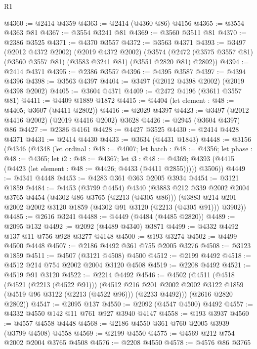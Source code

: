 \begin{lexlean}{R1}
\begin{coremodule}
@4360 := @2414 @4359
@4363 := @2414 (@4360 @86) @4156
@4365 := @3554 @4363 @81
@4367 := @3554 @3241 @81
@4369 := @3560 @3511 @81
@4370 := @2386 @3525
@4371 := @4370 @3557
@4372 := @3563 @4371
@4393 := @3497
    (@2012 @4372 @2002)
    (@2019 @4372 @2002)
    (@3574 (@2472 (@3575 @3557 @81) (@3560 @3557 @81) (@3583 @3241 @81) (@3551 @2820 @81) @2802))
@4394 := @2414 @4371
@4395 := @2386 @3557
@4396 := @4395 @3587
@4397 := @4394 @4396
@4398 := @3563 @4397
@4404 := @3497 (@2012 @4398 @2002) (@2019 @4398 @2002)
@4405 := @3604 @4371
@4409 := @2472 @4196 (@3611 @3557 @81)
@4411 := @4409 @1889 @1872
@4415 := @4404 (let element : @48 := @4405; @3607 (@4411 @2802))
@4416 := @2029 @4397
@4423 := @3497 (@2012 @4416 @2002) (@2019 @4416 @2002) @3628
@4426 := @2945 (@3604 @4397) @86
@4427 := @2386 @4161
@4428 := @4427 @3525
@4430 := @2414 @4428 @4371
@4431 := @2414 @4430
@4433 := @3634 (@4431 @1843)
@4448 := @3156
    (@4346
      (@4348
        (let ordinal : @48 := @4007;
        let batch : @48 := @4356;
        let phase : @48 := @4365;
        let i2 : @48 := @4367;
        let i3 : @48 := @4369;
        @4393 (@4415 (@4423 (let element : @48 := @4426; @4433 (@4411 @2855)))))
        @3506))
@4449 := @4341 @4448
@4453 := @4283 @361 @363 @2005 @3934
@4454 := @3121 @1859
@4484 := @4453
    (@3799 @4454)
    @4340
    (@3883
      @212
      @339
      @2002
      @2004
      @3765
      @4454
      (@4302 @86 @3765 (@2213 (@4305 @86)))
      (@3883 @214 @201 @2002 @2002 @3120 @1859 (@4302 @91 @3120 (@2213 (@4305 @91))) @3902))
@4485 := @2616 @3241
@4488 := @4449 (@4484 (@4485 @2820))
@4489 := @2095 @132
@4492 := @2092 (@4489 @4340) @3871
@4499 := @4332 @4492 @137 @11 @756 @928 @3277 @4148
@4500 := @193 @3274
@4502 := @4499 @4500 @4448
@4507 := @2186 @4492 @361 @755 @2005 @3276
@4508 := @3123 @1859
@4511 := @4507 (@3121 @4508) @4500
@4512 := @2199 @4492
@4518 := @4512 @214 @754 @2002 @2004 @3120 @4508
@4519 := @2208 @4492
@4521 := @4519 @91 @3120
@4522 := @2214 @4492
@4546 := @4502
    (@4511
      (@4518
        (@4521 (@2213 (@4522 @91)))
        (@4512
          @216
          @201
          @2002
          @2002
          @3122
          @1859
          (@4519 @96 @3122 (@2213 (@4522 @96)))
          (@2233 @4492)))
      (@2616 @2820 @2802))
@4547 := @2095 @137
@4550 := @2092 (@4547 @4500) @4492
@4557 := @4332 @4550 @142 @11 @761 @927 @3940 @4147
@4558 := @193 @3937
@4560 := @4557 @4558 @4448
@4568 := @2186 @4550 @361 @760 @2005 @3939 (@3799 @4508) @4558
@4569 := @2199 @4550
@4575 := @4569 @212 @754 @2002 @2004 @3765 @4508
@4576 := @2208 @4550
@4578 := @4576 @86 @3765

\end{coremodule}
\end{lexlean}
